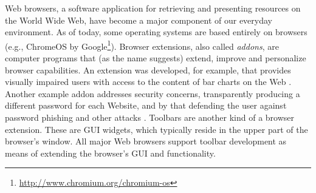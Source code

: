 \documentclass[11pt,oneside]{book}
\begin{document}
Web browsers, a software application for retrieving and presenting resources on the World Wide Web, have become a major component of our everyday environment. As of today, some operating systems are based entirely on browsers (e.g., ChromeOS by Google\footnote{\url{http://www.chromium.org/chromium-os}}). Browser extensions, also called {\it addons}, are computer programs that (as the name suggests) extend, improve and personalize browser capabilities. An extension was developed, for example, that provides visually impaired users with access to the content of bar charts on the Web \citep{elzer2007browser}. Another example addon addresses security concerns, transparently producing a different password for each Website, and by that defending the user against password phishing and other attacks \citep{ross2005stronger}. Toolbars are another kind of a browser extension. These are GUI widgets, which typically reside in the upper part of the browser's window. All major Web browsers support toolbar development as means of extending the browser's GUI and functionality. 
\end{document}
